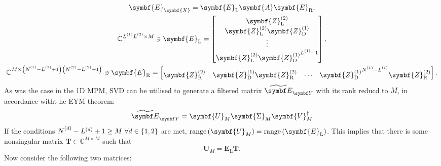 \begin{subequations}
    \begin{gather}
        \symbf{E}_{\symbf{X}} =
        \symbf{E}_{\text{L}}
        \symbf{A}
        \symbf{E}_{\text{R}},\\
        \mathbb{C}^{\Lone \Ltwo \times M} \ni
        \symbf{E}_{\text{L}} =
        \begin{bmatrix}
            \symbf{Z}^{(2)}_{\text{L}} \\
            \symbf{Z}^{(2)}_{\text{L}} \symbf{Z}^{(1)}_{\text{D}} \\
            \vdots \\
            \symbf{Z}^{(2)}_{\text{L}} {\symbf{Z}^{(1)}_{\text{D}}}^{\Lone - 1} \\
        \end{bmatrix},\label{eq:EL}\\
        \mathbb{C}^{M \times \left(\None - \Lone + 1\right)\left(\Ntwo - \Ltwo + 1\right)} \ni
        \symbf{E}_{\text{R}} =
        \begin{bmatrix}
            \symbf{Z}^{(2)}_{\text{R}} &
            \symbf{Z}^{(1)}_{\text{D}} \symbf{Z}^{(2)}_{\text{R}} &
            \cdots &
            {\symbf{Z}^{(1)}_{\text{D}}}^{\None - \Lone} \symbf{Z}^{(2)}_{\text{R}} \\
        \end{bmatrix}.
    \end{gather}
\end{subequations}
As was the case in the \ac{1D} \ac{MPM}, \ac{SVD} can be utilised to generate a
filtered matrix $\EYtilde$ with its rank reducd to $M$, in accordance witht he
\ac{EYM} theorem:
\begin{equation}
    \EYtilde =
        \symbf{U}_M^{\vphantom{\dagger}}
        \symbf{\Sigma}_M^{\vphantom{\dagger}}
        \symbf{V}_M^{\dagger}
\end{equation}
If the conditions $\Nd - L^{(d)} + 1 \geq M\ \forall d \in \lbrace 1, 2
\rbrace$ are met, $\range\left(\symbf{U}_M\right) =
\range\left(\symbf{E}_{\text{L}}\right)$. This implies that there is some
nonsingular matrix $\symbf{T} \in \mathbb{C}^{M \times M}$ such that
\begin{equation}
    \symbf{U}_M = \symbf{E}_{\text{L}} \symbf{T}.
\end{equation}
Now consider the following two matrices:
